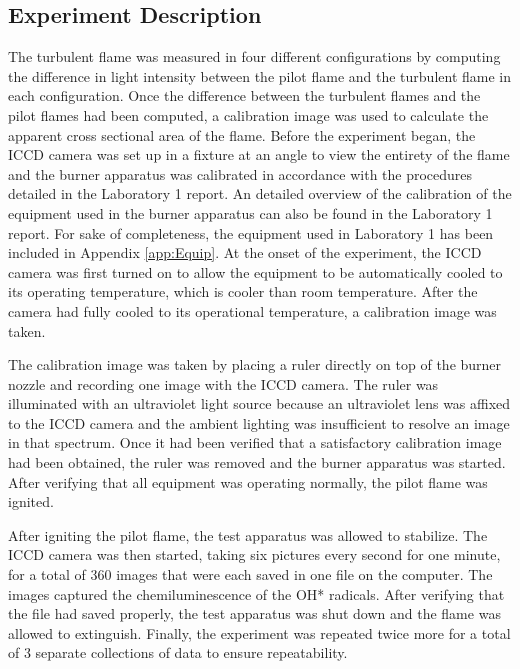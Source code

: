 \documentclass[12pt]{ussci} %
\begin{document}
\subsection{Experiment Description}
The turbulent flame was measured in four different configurations by computing the difference in light intensity between the pilot flame and the turbulent flame in each configuration.  Once the difference between the turbulent flames and the pilot flames had been computed, a calibration image was used to calculate the apparent cross sectional area of the flame.  Before the experiment began, the ICCD camera was set up in a fixture at an angle to view the entirety of the flame and the burner apparatus was calibrated in accordance with the procedures detailed in the Laboratory 1 report.  An detailed overview of the calibration of the equipment used in the burner apparatus can also be found in the Laboratory 1 report.  For sake of completeness, the equipment used in Laboratory 1 has been included in Appendix \ref{app:Equip}.  At the onset of the experiment, the ICCD camera was first turned on to allow the equipment to be automatically cooled to its operating temperature, which is cooler than room temperature.  After the camera had fully cooled to its operational temperature, a calibration image was taken.

The calibration image was taken by placing a ruler directly on top of the burner nozzle and recording one image with the ICCD camera.  The ruler was illuminated with an ultraviolet light source because an ultraviolet lens was affixed to the ICCD camera and the ambient lighting was insufficient to resolve an image in that spectrum.  Once it had been verified that a satisfactory calibration image had been obtained, the ruler was removed and the burner apparatus was started.  After verifying that all equipment was operating normally, the pilot flame was ignited.


After igniting the pilot flame, the test apparatus was allowed to stabilize.  The ICCD camera was then started, taking six pictures every second for one minute, for a total of 360 images that were each saved in one file on the computer.  The images captured the chemiluminescence of the OH* radicals.  After verifying that the file had saved properly, the test apparatus was shut down and the flame was allowed to extinguish.  Finally, the experiment was repeated twice more for a total of 3 separate collections of data to ensure repeatability.
\end{document}
